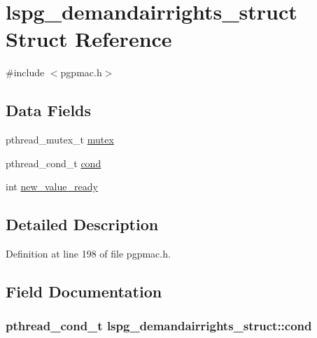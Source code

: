 \hypertarget{structlspg__demandairrights__struct}{\section{lspg\-\_\-demandairrights\-\_\-struct Struct Reference}
\label{structlspg__demandairrights__struct}
}


{\ttfamily \#include $<$pgpmac.\-h$>$}

\subsection*{Data Fields}
\begin{DoxyCompactItemize}
\item 
pthread\-\_\-mutex\-\_\-t \hyperlink{structlspg__demandairrights__struct_a874970af767d4bb329f9764075b30096}{mutex}
\item 
pthread\-\_\-cond\-\_\-t \hyperlink{structlspg__demandairrights__struct_addc1e3476a3f282a19b335f7875861d1}{cond}
\item 
int \hyperlink{structlspg__demandairrights__struct_ad686c9a04d0c7e10b236c234eaf03ce7}{new\-\_\-value\-\_\-ready}
\end{DoxyCompactItemize}


\subsection{Detailed Description}


Definition at line 198 of file pgpmac.\-h.



\subsection{Field Documentation}
\hypertarget{structlspg__demandairrights__struct_addc1e3476a3f282a19b335f7875861d1}{
\subsubsection[{cond}]{\setlength{\rightskip}{0pt plus 5cm}pthread\-\_\-cond\-\_\-t lspg\-\_\-demandairrights\-\_\-struct\-::cond}}\label{structlspg__demandairrights__struct_addc1e3476a3f282a19b335f7875861d1}


